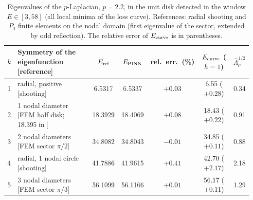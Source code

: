 
\begin{table}[ht]
\centering
\begin{tabular}{clccccc}
\toprule
$k$ & Symmetry of the eigenfunction [reference] & $E_{\rm ref}$ & $E_{\rm PINN}$ & rel.\ err.\ (\%) & $E_{\rm curve}$ ($h=1$) & $\bar\Lambda_p^{1/2}$ \\
\midrule
1 & radial, positive [shooting] & 6.5317 & 6.5337 & $+0.03$ & 6.55 ($+0.28$) & 0.34 \\
2 & 1 nodal diameter [FEM half disk; 18.395 in \cite{HJ11}] & 18.3929 & 18.4069 & $+0.08$ & 18.43 ($+0.22$) & 0.91 \\
3 & 2 nodal diameters [FEM sector $\pi/2$] & 34.8082 & 34.8043 & $-0.01$ & 34.85 ($+0.11$) & 0.88 \\
4 & radial, 1 nodal circle [shooting] & 41.7886 & 41.9615 & $+0.41$ & 42.70 ($+2.17$) & 2.18 \\
5 & 3 nodal diameters [FEM sector $\pi/3$] & 56.1099 & 56.1166 & $+0.01$ & 56.17 ($+0.11$) & 1.29 \\
\bottomrule
\end{tabular}
\caption{Eigenvalues of the $p$-Laplacian, $p=2.2$, in the unit disk detected in the window $E\in[3,58]$ (all local minima of the loss curve). References: radial shooting and $P_1$ finite elements on the nodal domain (first eigenvalue of the sector, extended by odd reflection). The relative error of $E_{\rm curve}$ is in parentheses.}
\label{tab.plap.disk}
\end{table}

